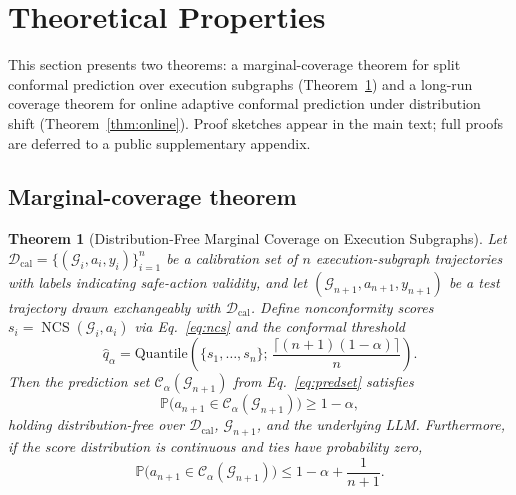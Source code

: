 \documentclass[12pt,a4paper]{article}
\newtheorem{theorem}{Theorem}
\theoremstyle{definition}
\theoremstyle{remark}
\providecommand{\Prob}{}\renewcommand{\Prob}{\mathbb{P}}
\newcommand{\Dcal}{\mathcal{D}}
\newcommand{\Ccal}{\mathcal{C}}
\newcommand{\Gcal}{\mathcal{G}}
\DeclareMathOperator{\NCS}{NCS}
\begin{document}
\section{Theoretical Properties}
\label{sec:theory}

This section presents two theorems: a marginal-coverage theorem for split conformal prediction over execution subgraphs (Theorem~\ref{thm:coverage}) and a long-run coverage theorem for online adaptive conformal prediction under distribution shift (Theorem~\ref{thm:online}). Proof sketches appear in the main text; full proofs are deferred to a public supplementary appendix.

\subsection{Marginal-coverage theorem}

\begin{theorem}[Distribution-Free Marginal Coverage on Execution Subgraphs]
\label{thm:coverage}
Let $\Dcal_{\mathrm{cal}} = \{(\Gcal_i, a_i, y_i)\}_{i=1}^{n}$ be a calibration set of $n$ execution-subgraph trajectories with labels indicating safe-action validity, and let $(\Gcal_{n+1}, a_{n+1}, y_{n+1})$ be a test trajectory drawn exchangeably with $\Dcal_{\mathrm{cal}}$. Define nonconformity scores $s_i = \NCS(\Gcal_i, a_i)$ via Eq.~\eqref{eq:ncs} and the conformal threshold
\begin{equation}
    \hat{q}_\alpha = \mathrm{Quantile}\left(\bigl\{s_1, \ldots, s_n\bigr\}; \, \frac{\lceil (n+1)(1-\alpha) \rceil}{n}\right).
\end{equation}
Then the prediction set $\Ccal_\alpha(\Gcal_{n+1})$ from Eq.~\eqref{eq:predset} satisfies
\begin{equation}
    \Prob\bigl(a_{n+1} \in \Ccal_\alpha(\Gcal_{n+1})\bigr) \geq 1 - \alpha,
\label{eq:coverage}
\end{equation}
holding distribution-free over $\Dcal_{\mathrm{cal}}$, $\Gcal_{n+1}$, and the underlying LLM. Furthermore, if the score distribution is continuous and ties have probability zero,
\begin{equation}
    \Prob\bigl(a_{n+1} \in \Ccal_\alpha(\Gcal_{n+1})\bigr) \leq 1 - \alpha + \frac{1}{n+1}.
\end{equation}
\end{theorem}
\end{document}
